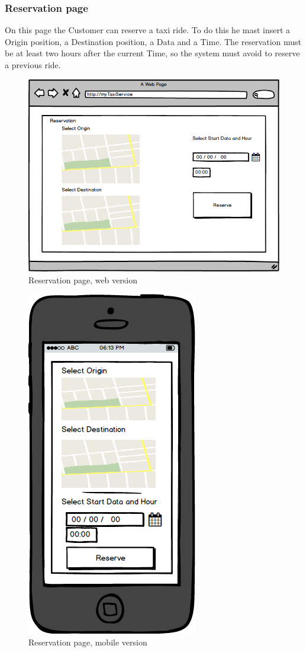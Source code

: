 \documentclass{report}
\begin{document}
			\subsubsection{Reservation page}
			On this page the Customer can reserve a taxi ride. To do this he mast insert a Origin position, a Destination position, a Data and a Time. The reservation must be at least two hours after 			the current Time, so the system must avoid to reserve a previous ride.
			\begin{figure}[H]
			\centering
			\includegraphics[scale=0.5]{IMG/UserInterfaces/reservationCustomer.png}
			\caption{Reservation page, web version}\label{visina8}
			\end{figure}
			\begin{figure}[H]
			\centering
			\includegraphics[scale=0.4]{IMG/UserInterfaces/reservationCustomer_m.png}
			\caption{Reservation page, mobile version}\label{visina8}
			\end{figure}
			
\end{document}
